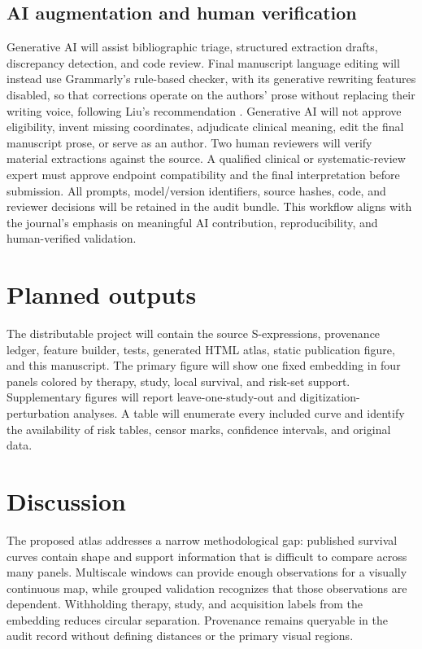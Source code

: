 \documentclass[17pt]{extarticle}
\begin{document}
\subsection{AI augmentation and human verification}

Generative AI will assist bibliographic triage, structured extraction drafts, discrepancy detection, and code review. Final manuscript language editing will instead use Grammarly's rule-based checker, with its generative rewriting features disabled, so that corrections operate on the authors' prose without replacing their writing voice, following Liu's recommendation \citep{liu2024grammarly}. Generative AI will not approve eligibility, invent missing coordinates, adjudicate clinical meaning, edit the final manuscript prose, or serve as an author. Two human reviewers will verify material extractions against the source. A qualified clinical or systematic-review expert must approve endpoint compatibility and the final interpretation before submission. All prompts, model/version identifiers, source hashes, code, and reviewer decisions will be retained in the audit bundle. This workflow aligns with the journal's emphasis on meaningful AI contribution, reproducibility, and human-verified validation.

\section{Planned outputs}

The distributable project will contain the source S-expressions, provenance ledger, feature builder, tests, generated HTML atlas, static publication figure, and this manuscript. The primary figure will show one fixed embedding in four panels colored by therapy, study, local survival, and risk-set support. Supplementary figures will report leave-one-study-out and digitization-perturbation analyses. A table will enumerate every included curve and identify the availability of risk tables, censor marks, confidence intervals, and original data.

\section{Discussion}

The proposed atlas addresses a narrow methodological gap: published survival curves contain shape and support information that is difficult to compare across many panels. Multiscale windows can provide enough observations for a visually continuous map, while grouped validation recognizes that those observations are dependent. Withholding therapy, study, and acquisition labels from the embedding reduces circular separation. Provenance remains queryable in the audit record without defining distances or the primary visual regions.
\end{document}
